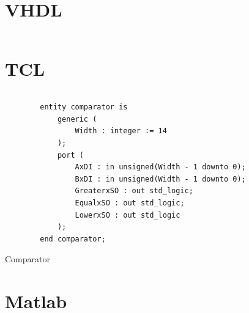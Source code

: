 \documentclass[a4paper,oneside]{alpenthesis/alpenthesis}
\begin{document}
\section{VHDL}
\inputminted{vhdl}{code/comparator.vhd}

\section{TCL}
\inputminted{tcl}{code/create_cores.tcl}

\begin{listing}
    \begin{verbatim}
        entity comparator is
            generic (
                Width : integer := 14
            );
            port (
                AxDI : in unsigned(Width - 1 downto 0);
                BxDI : in unsigned(Width - 1 downto 0);
                GreaterxSO : out std_logic;
                EqualxSO : out std_logic;
                LowerxSO : out std_logic
            );
        end comparator;
    \end{verbatim}
    \caption{Comparator}
    \label{lst:vhdl:comparator}
\end{listing}

\section{Matlab}
\tikzexternaldisable
\begin{tcolorbox}[
        breakable,
        title={
            \refstepcounter{listing}
            Listing \thelisting: Matlab Code
            \label{lst:makefile}
            \addcontentsline{lol}{listing}{\protect\numberline{\thelisting}Matlab Code}
        }
    ]
    \inputminted[style=solarizedlight]{matlab}{code/filterChainDesigns.m}
\end{tcolorbox}
\tikzexternalenable

\end{document}
